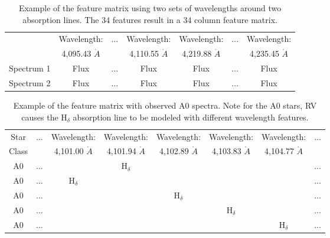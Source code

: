 \documentclass[trackchanges, floatfix, twocolumn, tighten]{aastex62}
\begin{document}
\begin{table}
\renewcommand{\thetable}{\arabic{table}}
\centering
\caption{Example of the feature matrix using two sets of wavelengths around two absorption lines. The 34 features result in a 34 column feature matrix.} 
\label{tab:feature-matrix2}
	\begin{tabular}{|c|c|c|c||c|c|c|}
	\tablewidth{0pt}
		\hline
				     & Wavelength:   & ... &  Wavelength:	 & Wavelength:   & ... & Wavelength:  \\
	  			     & 4,095.43 $\mathring{A}$          &     &  4,110.55 $\mathring{A}$         & 4,219.88 $\mathring{A}$          &     &  4,235.45 $\mathring{A}$ \\ \hline
		Spectrum 1 & Flux                   & ... & Flux                   & Flux                   & ... & Flux                   \\ \hline
		Spectrum 2 & Flux                   & ... & Flux                   & Flux                   & ... & Flux                   \\ \hline
	\end{tabular}
\end{table}


\begin{table}
\renewcommand{\thetable}{\arabic{table}}
\centering
\caption{Example of the feature matrix with observed A0 spectra. Note for the A0 stars, RV causes the H$_\delta$ absorption line to be modeled with different wavelength features.}
\label{tab:example}
	\begin{tabular}{|c|c|c|c|c|c|c|c|}
		\tablewidth{0pt}
		\hline 
		Star & ... &  Wavelength: & Wavelength:	& Wavelength: & Wavelength: & Wavelength: & ...  \\
		Class &  & 4,101.00 $\mathring{A}$ & 4,101.94 $\mathring{A}$ & 4,102.89 $\mathring{A}$ & 4,103.83 $\mathring{A}$ & 4,104.77 $\mathring{A}$ &  \\ \hline
		A0 & ... & & H$_\delta$ & & & & ...\\ \hline
		A0 & ... & H$_\delta$ & & & & & ... \\ \hline
		A0 & ... & & & H$_\delta$ & & & ... \\ \hline
		A0 & ... & & & & H$_\delta$ & & ... \\ \hline
		A0 & ... & & & & & H$_\delta$ & ... \\ \hline
	\end{tabular}
\end{table}
\end{document}
